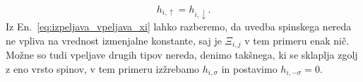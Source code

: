 \begin{appendices}
\begin{equation}
h_{i,\uparrow}=h_{i,\downarrow}.
\end{equation}
Iz En.~\eqref{eq:izpeljava_vpeljava_xi} lahko razberemo, da uvedba spinskega nereda ne vpliva na vrednost izmenjalne konstante, saj je $\Xi_{i,j}$ v tem primeru enak nič. Možne so tudi vpeljave drugih tipov nereda, denimo takšnega, ki se sklaplja zgolj z eno vrsto spinov, v tem primeru izžrebamo $h_{i,\sigma}$ in postavimo $h_{i,-\sigma}=0.$ 
\end{appendices}



\cleardoublepage
\printindex





